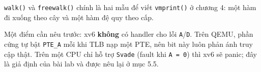 \texttt{walk()} và \texttt{freewalk()} chính là hai mẫu để viết \texttt{vmprint()} ở chương 4: một hàm đi xuống theo cây và một hàm đệ quy theo cấp.

Một điểm cần nêu trước: xv6 \textbf{không} có handler cho lỗi \texttt{A}/\texttt{D}. Trên QEMU, phần cứng tự bật \texttt{PTE\_A} mỗi khi TLB nạp một PTE, nên bit này luôn phản ánh truy cập thật. Trên một CPU chỉ hỗ trợ \texttt{Svade} (fault khi \texttt{A = 0}) thì xv6 sẽ panic; đây là giả định của bài lab và được nêu lại ở mục 5.5.
